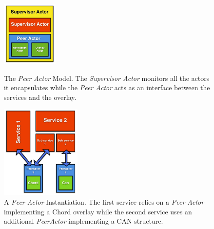\begin{figure}
  \begin{minipage}[c]{.35\linewidth}
	\vspace*{.5cm}
   \hspace*{-0.5cm}
      	\centering \includegraphics[width=2.8cm]{./FIGS/PeerActor.pdf}
   \hspace*{0.5cm}
	\vspace*{.5cm}
		\caption{The \emph{Peer Actor} Model. The \emph{Supervisor Actor} monitors all the actors it encapsulates while the \emph{Peer Actor} acts as an interface between the services and the overlay.}
\label{fig:supervisor}
   \end{minipage}
\hspace*{0.6cm}
   \begin{minipage}[c]{.55\linewidth}
   	\centering \includegraphics[width=4cm]{./FIGS/PeerActorServices.pdf}
	\vspace*{-0.25cm}
		\caption{A \emph{Peer Actor} Instantiation. The first service relies on a \emph{Peer Actor} implementing a Chord
overlay while the second service uses an additional \emph{PeerActor} implementing a CAN structure.}
		\label{fig:peeractor} 
  \end{minipage} \hfill
	\vspace*{-0.4cm}
\end{figure}

